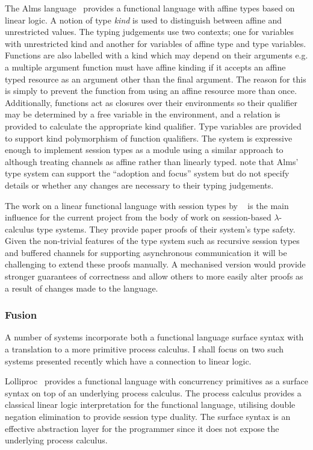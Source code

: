 \documentclass{mpaper}
\begin{document}
The Alms language~\cite{Aldrich:2009} provides a functional language with
affine types based on linear logic. A notion of type \textit{kind} is used to
distinguish between affine and unrestricted values. The typing judgements use
two contexts; one for variables with unrestricted kind and another for
variables of affine type and type variables. Functions are also labelled with
a kind which may depend on their arguments e.g. a multiple argument function
must have affine kinding if it accepts an affine typed resource as an argument
other than the final argument. The reason for this is simply to prevent the
function from using an affine resource more than once. Additionally, functions
act as closures over their environments so their qualifier may be determined
by a free variable in the environment, and a relation is provided to calculate
the appropriate kind qualifier. Type variables are provided to support kind
polymorphism of function qualifiers. The system is expressive enough to
implement session types as a module using a similar approach to
\citeauthor{Gay:2010:LAST}~\cite{Gay:2010:LAST} although treating channels as
affine rather than linearly typed. \citeauthor{Aldrich:2009} note that Alms'
type system can support the ``adoption and focus'' system but do not specify
details or whether any changes are necessary to their typing judgements.

The work on a linear functional language with session types by
\citeauthor{Gay:2010:LAST}~\cite{Gay:2010:LAST} is the main influence for the
current project from the body of work on session-based $\lambda$-calculus type
systems. They provide paper proofs of their system's type safety. Given the
non-trivial features of the type system such as recursive session types and
buffered channels for supporting asynchronous communication it will be
challenging to extend these proofs manually. A mechanised version would
provide stronger guarantees of correctness and allow others to more easily
alter proofs as a result of changes made to the language.

\subsubsection{Fusion}

A number of systems incorporate both a functional language surface syntax with
a translation to a more primitive process calculus. I shall focus on two such
systems presented recently which have a connection to linear logic.

Lolliproc~\cite{Mazurak:2010:LCC} provides a functional language with
concurrency primitives as a surface syntax on top of an underlying process
calculus. The process calculus provides a classical linear logic
interpretation for the functional language, utilising double negation
elimination to provide session type duality. The surface syntax is an
effective abstraction layer for the programmer since it does not expose the
underlying process calculus.
\end{document}
